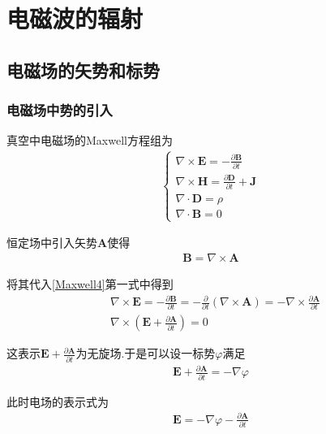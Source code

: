 \documentclass[main.tex]{subfiles}
\begin{document}
\chapter{电磁波的辐射}
\section{电磁场的矢势和标势}
\subsection{电磁场中势的引入}
真空中电磁场的Maxwell方程组为
\begin{align}
    \label{Maxwell4}\left\{\begin{array}{l}
        \nabla  \times \boldsymbol{E} = -\frac{\partial \boldsymbol{B} }{\partial t}  \\
        \nabla  \times \boldsymbol{H} = \frac{\partial \boldsymbol{D} }{\partial t}   +\boldsymbol{J}\\
        \nabla \cdot  \boldsymbol{D} = \rho \\
        \nabla \cdot \boldsymbol{B} = 0
    \end{array}\right.
\end{align}

恒定场中引入矢势$\boldsymbol{A}$使得
\begin{align}
    \boldsymbol{B} = \nabla \times \boldsymbol{A}
\end{align}

将其代入\ref{Maxwell4}第一式中得到
\begin{align}
    &\nabla  \times \boldsymbol{E} = -\frac{\partial \boldsymbol{B} }{\partial t} = -\frac{\partial }{\partial t}(\nabla \times \boldsymbol{A}) = -\nabla \times \frac{\partial \boldsymbol{A} }{\partial t}\\
    &\nabla \times (\boldsymbol{E} + \frac{\partial \boldsymbol{A} }{\partial t}) = 0
\end{align}

这表示$\displaystyle \boldsymbol{E} + \frac{\partial \boldsymbol{A} }{\partial t}$为无旋场.于是可以设一标势$\varphi$满足
\begin{align}
    \displaystyle \boldsymbol{E} + \frac{\partial \boldsymbol{A} }{\partial t} = -\nabla \varphi
\end{align}

此时电场的表示式为
\begin{align}
    \displaystyle \boldsymbol{E}  = -\nabla \varphi - \frac{\partial \boldsymbol{A} }{\partial t}
\end{align}
\end{document}
